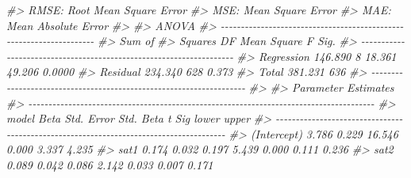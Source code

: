 \documentclass[
]{article}
\newenvironment{Shaded}{\begin{snugshade}}{\end{snugshade}}
\newcommand{\CommentTok}[1]{\textcolor[rgb]{0.56,0.35,0.01}{\textit{#1}}}
\begin{document}
\begin{Shaded}
\begin{Highlighting}[]
\CommentTok{\#\textgreater{}  RMSE: Root Mean Square Error }
\CommentTok{\#\textgreater{}  MSE: Mean Square Error }
\CommentTok{\#\textgreater{}  MAE: Mean Absolute Error }
\CommentTok{\#\textgreater{} }
\CommentTok{\#\textgreater{}                                ANOVA                                 }
\CommentTok{\#\textgreater{} {-}{-}{-}{-}{-}{-}{-}{-}{-}{-}{-}{-}{-}{-}{-}{-}{-}{-}{-}{-}{-}{-}{-}{-}{-}{-}{-}{-}{-}{-}{-}{-}{-}{-}{-}{-}{-}{-}{-}{-}{-}{-}{-}{-}{-}{-}{-}{-}{-}{-}{-}{-}{-}{-}{-}{-}{-}{-}{-}{-}{-}{-}{-}{-}{-}{-}{-}{-}}
\CommentTok{\#\textgreater{}                Sum of                                               }
\CommentTok{\#\textgreater{}               Squares         DF    Mean Square      F         Sig. }
\CommentTok{\#\textgreater{} {-}{-}{-}{-}{-}{-}{-}{-}{-}{-}{-}{-}{-}{-}{-}{-}{-}{-}{-}{-}{-}{-}{-}{-}{-}{-}{-}{-}{-}{-}{-}{-}{-}{-}{-}{-}{-}{-}{-}{-}{-}{-}{-}{-}{-}{-}{-}{-}{-}{-}{-}{-}{-}{-}{-}{-}{-}{-}{-}{-}{-}{-}{-}{-}{-}{-}{-}{-}}
\CommentTok{\#\textgreater{} Regression    146.890          8         18.361    49.206    0.0000 }
\CommentTok{\#\textgreater{} Residual      234.340        628          0.373                     }
\CommentTok{\#\textgreater{} Total         381.231        636                                    }
\CommentTok{\#\textgreater{} {-}{-}{-}{-}{-}{-}{-}{-}{-}{-}{-}{-}{-}{-}{-}{-}{-}{-}{-}{-}{-}{-}{-}{-}{-}{-}{-}{-}{-}{-}{-}{-}{-}{-}{-}{-}{-}{-}{-}{-}{-}{-}{-}{-}{-}{-}{-}{-}{-}{-}{-}{-}{-}{-}{-}{-}{-}{-}{-}{-}{-}{-}{-}{-}{-}{-}{-}{-}}
\CommentTok{\#\textgreater{} }
\CommentTok{\#\textgreater{}                                   Parameter Estimates                                   }
\CommentTok{\#\textgreater{} {-}{-}{-}{-}{-}{-}{-}{-}{-}{-}{-}{-}{-}{-}{-}{-}{-}{-}{-}{-}{-}{-}{-}{-}{-}{-}{-}{-}{-}{-}{-}{-}{-}{-}{-}{-}{-}{-}{-}{-}{-}{-}{-}{-}{-}{-}{-}{-}{-}{-}{-}{-}{-}{-}{-}{-}{-}{-}{-}{-}{-}{-}{-}{-}{-}{-}{-}{-}{-}{-}{-}{-}{-}{-}{-}{-}{-}{-}{-}{-}{-}{-}{-}{-}{-}{-}{-}}
\CommentTok{\#\textgreater{}       model      Beta    Std. Error    Std. Beta      t        Sig      lower    upper }
\CommentTok{\#\textgreater{} {-}{-}{-}{-}{-}{-}{-}{-}{-}{-}{-}{-}{-}{-}{-}{-}{-}{-}{-}{-}{-}{-}{-}{-}{-}{-}{-}{-}{-}{-}{-}{-}{-}{-}{-}{-}{-}{-}{-}{-}{-}{-}{-}{-}{-}{-}{-}{-}{-}{-}{-}{-}{-}{-}{-}{-}{-}{-}{-}{-}{-}{-}{-}{-}{-}{-}{-}{-}{-}{-}{-}{-}{-}{-}{-}{-}{-}{-}{-}{-}{-}{-}{-}{-}{-}{-}{-}}
\CommentTok{\#\textgreater{} (Intercept)     3.786         0.229                 16.546    0.000     3.337    4.235 }
\CommentTok{\#\textgreater{}        sat1     0.174         0.032        0.197     5.439    0.000     0.111    0.236 }
\CommentTok{\#\textgreater{}        sat2     0.089         0.042        0.086     2.142    0.033     0.007    0.171 }

\end{Highlighting}
\end{Shaded}
\end{document}
